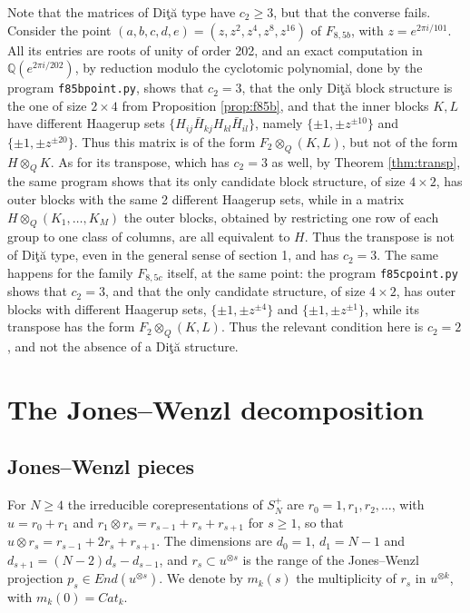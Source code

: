 \documentclass[11pt]{amsart}
\begin{document}
Note that the matrices of Di\c t\u a type have $c_2\geq3$, but that the converse fails. Consider the point $(a,b,c,d,e)=(z,z^2,z^4,z^8,z^{16})$ of $F_{8,5b}$, with $z=e^{2\pi i/101}$. All its entries are roots of unity of order 202, and an exact computation in $\mathbb Q(e^{2\pi i/202})$, by reduction modulo the cyclotomic polynomial, done by the program \texttt{f85bpoint.py}, shows that $c_2=3$, that the only Di\c t\u a block structure is the one of size $2\times4$ from Proposition \ref{prop:f85b}, and that the inner blocks $K,L$ have different Haagerup sets $\{H_{ij}\bar{H}_{kj}H_{kl}\bar{H}_{il}\}$, namely $\{\pm1,\pm z^{\pm10}\}$ and $\{\pm1,\pm z^{\pm20}\}$. Thus this matrix is of the form $F_2\otimes_Q(K,L)$, but not of the form $H\otimes_QK$. As for its transpose, which has $c_2=3$ as well, by Theorem \ref{thm:transp}, the same program shows that its only candidate block structure, of size $4\times2$, has outer blocks with the same 2 different Haagerup sets, while in a matrix $H\otimes_Q(K_1,\ldots,K_M)$ the outer blocks, obtained by restricting one row of each group to one class of columns, are all equivalent to $H$. Thus the transpose is not of Di\c t\u a type, even in the general sense of section 1, and has $c_2=3$. The same happens for the family $F_{8,5c}$ itself, at the same point: the program \texttt{f85cpoint.py} shows that $c_2=3$, and that the only candidate structure, of size $4\times2$, has outer blocks with different Haagerup sets, $\{\pm1,\pm z^{\pm4}\}$ and $\{\pm1,\pm z^{\pm1}\}$, while its transpose has the form $F_2\otimes_Q(K,L)$. Thus the relevant condition here is $c_2=2$, and not the absence of a Di\c t\u a structure.

\section{The Jones--Wenzl decomposition}\label{sec:jw}

\subsection{Jones--Wenzl pieces}\label{sec:jwpieces}

For $N\geq4$ the irreducible corepresentations of $S_N^+$ are $r_0=1,r_1,r_2,\ldots$, with $u=r_0+r_1$ and $r_1\otimes r_s=r_{s-1}+r_s+r_{s+1}$ for $s\geq1$, so that $u\otimes r_s=r_{s-1}+2r_s+r_{s+1}$. The dimensions are $d_0=1$, $d_1=N-1$ and $d_{s+1}=(N-2)d_s-d_{s-1}$, and $r_s\subset u^{\otimes s}$ is the range of the Jones--Wenzl projection $p_s\in End(u^{\otimes s})$. We denote by $m_k(s)$ the multiplicity of $r_s$ in $u^{\otimes k}$, with $m_k(0)=Cat_k$.
\end{document}
